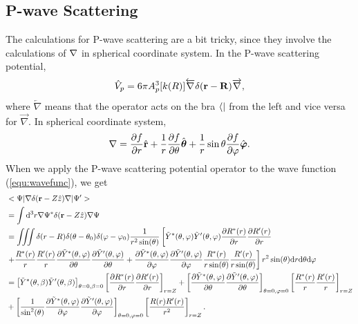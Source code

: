 \documentclass[british,english]{article}
\numberwithin{equation}{section}
\numberwithin{figure}{section}
\begin{document}
\subsection{P-wave Scattering}
The calculations for P-wave scattering are a bit tricky, since they involve the calculations of ${\bf \nabla}$ in spherical coordinate system. In the P-wave scattering potential, 
\begin{equation}
\hat{V}_p = 6\pi A_{p}^{3}[k(R)]\overleftarrow{\nabla}\delta({\bf r}-{\bf R})\overrightarrow{\nabla},
\end{equation} 
where $\overleftarrow{\nabla}$ means that the operator acts on the bra $\bra{}$ from the left and vice versa for $\overrightarrow{\nabla}$. In spherical coordinate system, 
\begin{equation}
\begin{aligned}
{\bf \nabla}={\frac{\partial f}{\partial r}}\hat{\mathbf r}
+ {\frac{1}{r}}{\frac{\partial f}{\partial \theta}}\hat{\boldsymbol \theta}
+ {\frac{1}{r}\sin\theta}{\frac{\partial f}{\partial \varphi}}\hat{\boldsymbol \varphi}.
\end{aligned}
\end{equation}
When we apply the P-wave scattering potential operator to the wave function (\ref{equ:wavefunc}), we get 
\begin{equation}
\begin{aligned}
& <\Psi|\nabla\delta({\bf r}-Z{\hat z})\nabla|\Psi'>\\
&= \int\mathrm d^3r\nabla\Psi^*\delta({\bf r}-Z{\hat z})\nabla \Psi \\
&= \iiint \delta(r-R)\delta(\theta-\theta_0)\delta(\varphi-\varphi_0)\frac{1}{r^2\sin(\theta)}\left[\tilde{Y}^*(\theta,\varphi)\tilde{Y}'(\theta,\varphi)\frac{\partial R^*(r)}{\partial r}\frac{\partial R'(r)}{\partial r}\right.\\
&\left.+\frac{R^*(r)}{r}\frac{R'(r)}{r}\frac{\partial \tilde{Y}^*(\theta,\varphi)}{\partial \theta}\frac{\partial \tilde{Y}'(\theta,\varphi)}{\partial \theta}+\frac{\partial \tilde{Y}^*(\theta,\varphi)}{\partial \varphi}\frac{\partial \tilde{Y}'(\theta,\varphi)}{\partial \varphi}\frac{R^*(r)}{r\sin(\theta)}\frac{R'(r)}{r\sin(\theta)}\right]r^2\sin(\theta)\mathrm d r \mathrm d \theta \mathrm d\varphi \\
&=\left[\tilde{Y}^*(\theta,\beta)\tilde{Y}'(\theta,\beta)\right]_{\theta=0,\beta=0}\left[\frac{\partial R^*(r)}{\partial r}\frac{\partial R'(r)}{\partial r}\right]_{r=Z}+\left[\frac{\partial \tilde{Y}^*(\theta,\varphi)}{\partial \theta}\frac{\partial \tilde{Y}'(\theta,\varphi)}{\partial \theta}\right]_{\theta=0,\varphi=0}\left[\frac{R^*(r)}{r}\frac{R'(r)}{r}\right]_{r=Z}\\
&+\left[\frac{1}{\sin^2(\theta)}\frac{\partial \tilde{Y}^*(\theta,\varphi)}{\partial \varphi}\frac{\partial \tilde{Y}'(\theta,\varphi)}{\partial \varphi}\right]_{\theta=0,\varphi=0}\left[\frac{R(r)R'(r)}{r^2}\right]_{r=Z}.
\end{aligned}
\end{equation}
\end{document}
